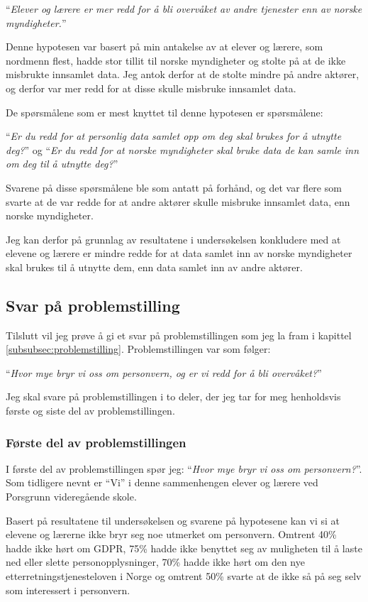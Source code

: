 ``\textit{Elever og lærere er mer redd for å bli overvåket av andre tjenester enn av norske myndigheter.}''

Denne hypotesen var basert på min antakelse av at elever og lærere, som nordmenn flest, hadde stor tillit til norske myndigheter og stolte på at de ikke misbrukte innsamlet data. \parencite{video:eia_tillit} Jeg antok derfor at de stolte mindre på andre aktører, og derfor var mer redd for at disse skulle misbruke innsamlet data.
\newpage

De spørsmålene som er mest knyttet til denne hypotesen er spørsmålene:

``\textit{Er du redd for at personlig data samlet opp om deg skal brukes for å utnytte deg?}'' og ``\textit{Er du redd for at norske myndigheter skal bruke data de kan samle inn om deg til å utnytte deg?}''

Svarene på disse spørsmålene ble som antatt på forhånd, og det var flere som svarte at de var redde for at andre aktører skulle misbruke innsamlet data, enn norske myndigheter.

Jeg kan derfor på grunnlag av resultatene i undersøkelsen konkludere med at elevene og lærere er mindre redde for at data samlet inn av norske myndigheter skal brukes til å utnytte dem, enn data samlet inn av andre aktører.

\subsection{Svar på problemstilling}
Tilslutt vil jeg prøve å gi et svar på problemstillingen som jeg la fram i kapittel \ref{subsubsec:problemstilling}. Problemstillingen var som følger: 

``\textit{Hvor mye bryr vi oss om personvern, og er vi redd for å bli overvåket?}''

Jeg skal svare på problemstillingen i to deler, der jeg tar for meg henholdsvis første og siste del av problemstillingen.

\subsubsection{Første del av problemstillingen}
I første del av problemstillingen spør jeg: ``\textit{Hvor mye bryr vi oss om personvern?}''. Som tidligere nevnt er ``Vi'' i denne sammenhengen elever og lærere ved Porsgrunn videregående skole. 

Basert på resultatene til undersøkelsen og svarene på hypotesene kan vi si at elevene og lærerne ikke bryr seg noe utmerket om personvern. Omtrent 40\% hadde ikke hørt om GDPR, 75\% hadde ikke benyttet seg av muligheten til å laste ned eller slette personopplysninger, 70\% hadde ikke hørt om den nye etterretningstjenesteloven i Norge og omtrent 50\% svarte at de ikke så på seg selv som interessert i personvern.


